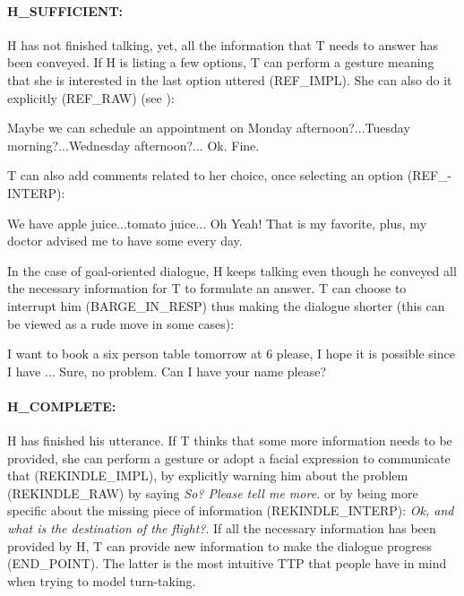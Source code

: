                    	\paragraph{H\_SUFFICIENT:} H has not finished talking, yet, all the information that T needs to answer has been conveyed. If H is listing a few options, T can perform a gesture meaning that she is interested in the last option uttered (REF\_IMPL). She can also do it explicitly (REF\_RAW) (see \cite{El-Asri2014a}):
                    
                    	\begin{dialogue}
							 Maybe we can schedule an appointment on Monday afternoon?...Tuesday morning?...Wednesday afternoon?...
							 Ok. Fine.
						\end{dialogue}
                        
                   	T can also add comments related to her choice, once selecting an option (REF\_-\\INTERP):
                    
                    	\begin{dialogue}
							 We have apple juice...tomato juice...
							 Oh Yeah! That is my favorite, plus, my doctor advised me to have some every day.
						\end{dialogue}
                    
                    In the case of goal-oriented dialogue, H keeps talking even though he conveyed all the necessary information for T to formulate an answer. T can choose to interrupt him (BARGE\_IN\_RESP) thus making the dialogue shorter (this can be viewed as a rude move in some cases):
                    
                 		\begin{dialogue}
							 I want to book a six person table tomorrow at 6 please, I hope it is possible since I have ...
							 Sure, no problem. Can I have your name please?
						\end{dialogue}
                        
                  	\paragraph{H\_COMPLETE:} H has finished his utterance. If T thinks that some more information needs to be provided, she can perform a gesture or adopt a facial expression to communicate that (REKINDLE\_IMPL), by explicitly warning him about the problem (REKINDLE\_RAW) by saying \textit{So? Please tell me more.} or by being more specific about the missing piece of information (REKINDLE\_INTERP): \textit{Ok, and what is the destination of the flight?}. If all the necessary information has been provided by H, T can provide new information to make the dialogue progress (END\_POINT). The latter is the most intuitive TTP that people have in mind when trying to model turn-taking.
                    
